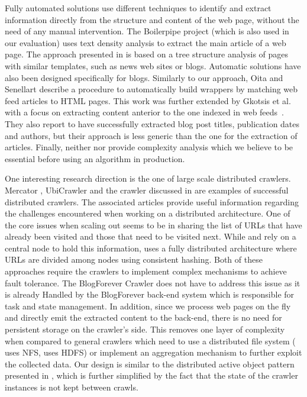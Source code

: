 Fully automated solutions use different techniques to identify and 
extract information directly from the structure and content of the web 
page, without the need of any manual intervention. The Boilerpipe project 
\cite{kohlschuetter2010} (which is also used in our evaluation) uses text 
density analysis to extract the main article of a web page. The approach 
presented in \cite{treeedit} is based on a tree structure analysis of 
pages with similar templates, such as news web sites or blogs. Automatic 
solutions have also been designed specifically for blogs. Similarly to 
our approach, Oita and Senellart \cite{oita2010} describe a procedure 
to automatically build wrappers by matching web feed articles to
HTML pages. This work was further extended by Gkotsis et al. with 
a focus on extracting content anterior to the one indexed in web 
feeds~\cite{gkotsis2013}. They also report to have successfully extracted 
blog post titles, publication dates and authors, but their approach 
is less generic than the one for the extraction of articles. Finally, 
neither \cite{oita2010} nor \cite{gkotsis2013} provide complexity 
analysis which we believe to be essential before using an algorithm 
in production.

One interesting research direction is the one of large scale distributed 
crawlers. Mercator \cite{heydon99mercator}, UbiCrawler \cite{boldi2003} 
and the crawler discussed in \cite{shkapenyuk2002} are examples of 
successful distributed crawlers. The associated articles provide useful 
information regarding the challenges encountered when working on a 
distributed architecture. One of the core issues when scaling out seems 
to be in sharing the list of URLs that have already been visited and 
those that need to be visited next. While \cite{heydon99mercator} and 
\cite{shkapenyuk2002} rely on a central node to hold this information, 
\cite{boldi2003} uses a fully distributed architecture where URLs are 
divided among nodes using consistent hashing. Both of these approaches 
require the crawlers to implement complex mechanisms to achieve 
fault tolerance. The BlogForever Crawler does not have to address this
issue as it is already Handled by the BlogForever back-end system which
is responsible for task and state management. In addition,
since we process web pages on the fly and directly emit the extracted 
content to the back-end, there is no need for persistent storage on 
the crawler's side. This removes one layer of complexity when compared 
to general crawlers which need to use a distributed file system 
(\cite{shkapenyuk2002} uses NFS, \cite{berger2011} uses HDFS) or 
implement an aggregation mechanism to further exploit the collected data. 
Our design is similar to the distributed active object pattern presented 
in \cite{activeobject1996}, which is further simplified by the fact that 
the state of the crawler instances is not kept between crawls.
